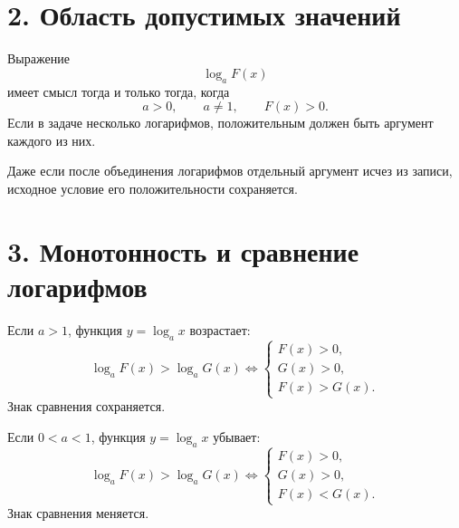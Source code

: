\documentclass[a4paper,12pt]{article}
\begin{document}
\section*{2. Область допустимых значений}
\begin{keybox}
Выражение
\[
\log_a F(x)
\]
имеет смысл тогда и только тогда, когда
\[
a>0,\qquad a\ne1,\qquad F(x)>0.
\]
Если в задаче несколько логарифмов, положительным должен быть аргумент каждого из них.
\end{keybox}

\begin{warnbox}
Даже если после объединения логарифмов отдельный аргумент исчез из записи, исходное
условие его положительности сохраняется.
\end{warnbox}

\section*{3. Монотонность и сравнение логарифмов}
\begin{keybox}
Если $a>1$, функция $y=\log_a x$ возрастает:
\[
\log_a F(x)>\log_a G(x)
\Longleftrightarrow
\begin{cases}
F(x)>0,\\
G(x)>0,\\
F(x)>G(x).
\end{cases}
\]
Знак сравнения сохраняется.
\end{keybox}

\begin{keybox}
Если $0<a<1$, функция $y=\log_a x$ убывает:
\[
\log_a F(x)>\log_a G(x)
\Longleftrightarrow
\begin{cases}
F(x)>0,\\
G(x)>0,\\
F(x)<G(x).
\end{cases}
\]
Знак сравнения меняется.
\end{keybox}

\begin{center}
\end{center}
\end{document}
